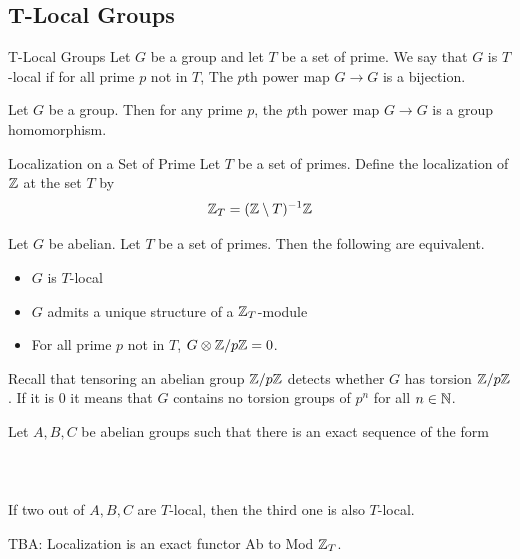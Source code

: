 \documentclass[a4paper]{article}
\begin{document}
\subsection{T-Local Groups}
\begin{defn}{T-Local Groups}{} Let $G$ be a group and let $T$ be a set of prime. We say that $G$ is $T$-local if for all prime $p$ not in $T$, The $p$th power map $G\to G$ is a bijection. 
\end{defn}

\begin{lmm}{}{} Let $G$ be a group. Then for any prime $p$, the $p$th power map $G\to G$ is a group homomorphism. 
\end{lmm}

\begin{defn}{Localization on a Set of Prime}{} Let $T$ be a set of primes. Define the localization of $\mathbb{Z}$ at the set $T$ by $$\mathbb{Z}_T=(\mathbb{Z}\setminus T)^{-1}\mathbb{Z}$$
\end{defn}

\begin{prp}{}{} Let $G$ be abelian. Let $T$ be a set of primes. Then the following are equivalent. 
\begin{itemize}
\item $G$ is $T$-local
\item $G$ admits a unique structure of a $\mathbb{Z}_T$-module
\item For all prime $p$ not in $T$, $G\otimes\mathbb{Z}/p\mathbb{Z}=0$. 
\end{itemize}
\end{prp}

Recall that tensoring an abelian group $\mathbb{Z}/p\mathbb{Z}$ detects whether $G$ has torsion $\mathbb{Z}/p\mathbb{Z}$. If it is $0$ it means that $G$ contains no torsion groups of $p^n$ for all $n\in\mathbb{N}$. 

\begin{lmm}{}{} Let $A,B,C$ be abelian groups such that there is an exact sequence of the form \\~\\
\\~\\
If two out of $A,B,C$ are $T$-local, then the third one is also $T$-local. 
\end{lmm}

TBA: Localization is an exact functor Ab to Mod $\mathbb{Z}_T$. 
\end{document}
